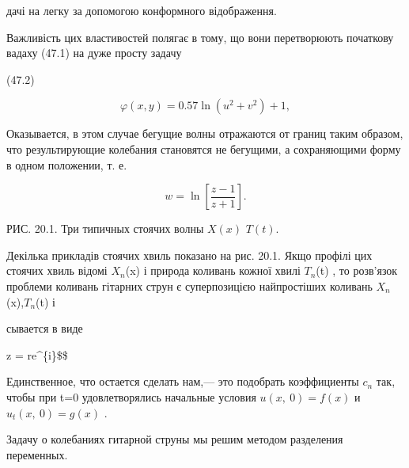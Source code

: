 \documentclass[
  ukrainian,
]{article}
\begin{document}
дачі на легку за допомогою
конформного відображення.

Важливість цих властивостей полягає в тому, що вони перетворюють
початкову вадаху (47.1) на дуже просту задачу

(47.2)

\[
\varphi(x, y) = 0.57 \ln(u^2 + v^2) + 1,
\]

Оказывается, в этом случае бегущие волны отражаются от границ таким
образом, что результирующие колебания становятся не бегущими, а
сохраняющими форму в одном положении, т. е.

\[
w = \ln \left[ \frac{z-1}{z+1} \right].
\]

РИС. 20.1. Три типичных стоячих волны \(X(x)\) \(T(t)\).

Декілька прикладів стоячих хвиль показано на рис. 20.1. Якщо профілі цих
стоячих хвиль відомі \(X_n\)(x) і природа коливань кожної хвилі
\(T_n\)(t) , то розв'язок проблеми коливань гітарних струн є
суперпозицією найпростіших коливань \(X_n\)(x),\(T_n\)(t) і

сывается в виде

z = re\^{}\{i\theta\}\$\$

Единственное, что остается сделать нам,--- это подобрать коэффициенты
\(c_n\) так, чтобы при t=0 удовлетворялись начальные условия
\(u\left(x,\ 0\right)=f\left(x\right)\) и
\(u_t\left(x,\ 0\right)=g\left(x\right)\) .

Задачу о колебаниях гитарной струны мы решим методом разделения
переменных.
\end{document}
